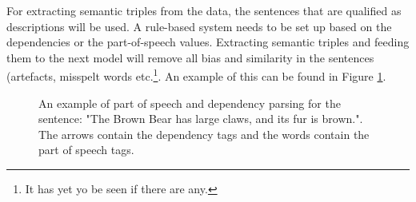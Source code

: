 \documentclass{article}
\begin{document}
For extracting semantic triples from the data, the sentences that are qualified as descriptions will be used.
A rule-based system needs to be set up based on the dependencies or the part-of-speech values. Extracting semantic triples and feeding them to the next model will remove all bias and similarity in the sentences (artefacts, misspelt words etc.\footnote{It has yet yo be seen if there are any.}.
An example of this can be found in Figure \ref{fig:PoS_example}.

\begin{figure} [t]
    \centering
    \vspace{-2.0cm}
    \makebox[\textwidth][c]{}
    \caption{An example of part of speech and dependency parsing for the sentence: "The Brown Bear has large claws, and its fur is brown.". The arrows contain the dependency tags and the words contain the part of speech tags.}
    \label{fig:PoS_example}
\end{figure}

\end{document}

